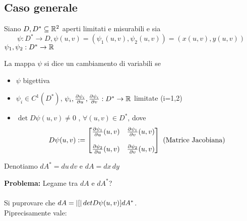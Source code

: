 \subsection{Caso generale}
Siano $D, D^* \subseteq \mathbb{R}^2$ aperti limitati e misurabili e sia 
$$\psi:D^*\to D, \psi(u,v) = \left(\psi_1(u,v), \psi_2(u,v)\right) = \left(x(u,v), y(u,v)\right)$$
$\psi_1, \psi_2 : D^* \to \mathbb{R}$
\begin{definition}
  \label{cambiamentovariabili}
  La mappa $\psi$ si dice un cambiamento di variabili se
  \begin{itemize}
    \item $\psi$ \ace bigettiva
    \item $\psi_i \in C^1(D^*)$, $\psi_i, \frac{\partial \psi_i}{\partial u}, \frac{\partial \psi_i}{\partial v} : D^* \to \mathbb{R}$ limitate (i=1,2)
    \item $\det D\psi(u,v)\not = 0$ , $\forall (u,v)\in D^*$, dove
          $$D \psi(u,v) := \begin{bmatrix}
            \frac{\partial \psi_1}{\partial u} (u,v) & \frac{\partial \psi_1}{\partial v} (u,v)\\
            \\
            \frac{\partial \psi_2}{\partial u} (u,v) & \frac{\partial \psi_2}{\partial v} (u,v) \\
          \end{bmatrix} \text{ (Matrice Jacobiana)}$$
  \end{itemize}
  Denotiamo $dA^* = du\,dv$ e $dA = dx\,dy$
\end{definition}
\textbf{Problema:} Legame tra $dA$ e $dA^*$? \\\\
Si pu\aco provare che $dA = \left\lvert [ \right\rvert det D\psi(u,v)] dA^*$.\\
Pi\acu precisamente vale:
